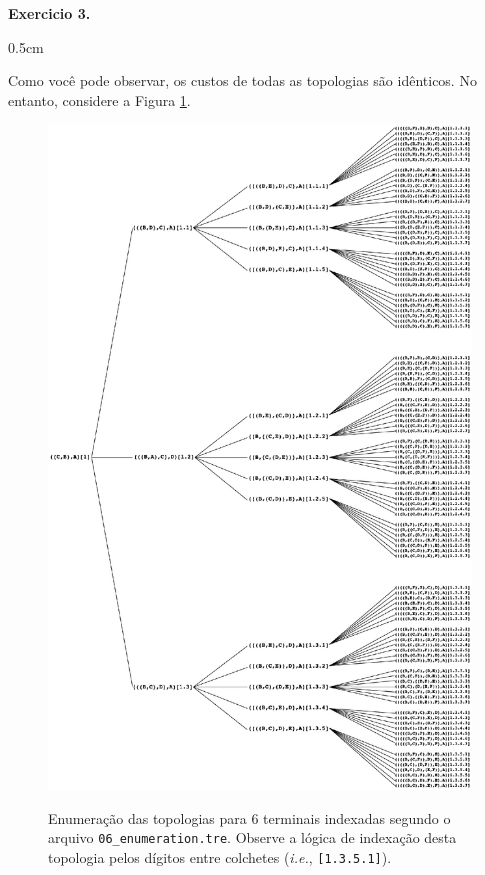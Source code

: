 \begin{refsection}
\begin{blackBlock}{\textbf{Exercicio 3.}}
\begin {myindentpar}{0.5cm}
\begin{enumerate}[\itshape i.]
\end{enumerate}
\end{myindentpar}

\end{blackBlock}

Como você pode observar, os custos de todas as topologias são idênticos. No entanto, considere a Figura \ref{tut3:fig:enumeration_indexed}.

  \begin{figure}[H]
       \centering
      {\includegraphics[scale=0.80]{figures/tut3/enumeration_A4.eps}}
      {\caption[Enumeração indexada]{Enumeração das topologias para 6 terminais indexadas segundo o arquivo \texttt{06\_enumeration.tre}. Observe a lógica de indexação desta topologia pelos dígitos entre colchetes (\textit{i.e.}, \texttt{[1.3.5.1]}).}\label{tut3:fig:enumeration_indexed}}
  \end{figure}


\end{refsection}

